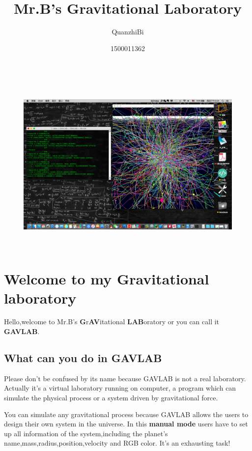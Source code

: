 \documentclass[12pt]{article}
\begin{document}
\title{Mr.B's Gravitational Laboratory}
\author{QuanzhiBi}
\author{1500011362}
\maketitle

\begin{figure}[H]
\centering
\includegraphics[width=14.4cm,height=9cm]{1000.png}
\end{figure}

\clearpage
\tableofcontents
\clearpage

\section{Welcome to my Gravitational laboratory}
Hello,welcome to Mr.B's \textbf{G}r\textbf{AV}itational \textbf{LAB}oratory or you can call it \textbf{GAVLAB}.

\subsection{What can you do in GAVLAB} %
Please don't be confused by its name because GAVLAB is not a real laboratory.
Actually it's a virtual laboratory running on computer, a program which can simulate 
the physical process or a system driven by gravitational force.

You can simulate any gravitational process because GAVLAB allows the users to
design their own system in the universe.
In this \textbf{manual mode} users have to set up all information of the system,including the planet's name,mass,radius,position,velocity and RGB color.
It's an exhausting task!
\end{document}
